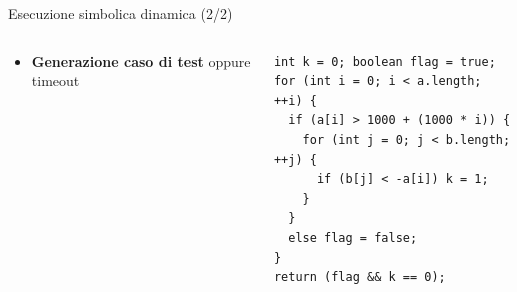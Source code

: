 \documentclass{beamer}
\begin{document}
\begin{frame}[fragile]{Esecuzione simbolica dinamica (2/2)}
\begin{columns}[T]
\begin{column}{\textwidth}
\begin{itemize}
\begin{itemize}
                    \item \textbf{Generazione caso di test} oppure timeout
                \end{itemize}
            \end{itemize}
            \endgroup
        \end{column}
        \begin{column}{0.53\textwidth}
            \vspace{-9.25mm}
            \hspace{-36.75mm}
            \begin{minipage}{\dimexpr\textwidth-3mm}
            \begin{lstlisting}[frame=single]
int k = 0; boolean flag = true;
for (int i = 0; i < a.length; ++i) {
  if (a[i] > 1000 + (1000 * i)) {
    for (int j = 0; j < b.length; ++j) {
      if (b[j] < -a[i]) k = 1;
    }
  } 
  else flag = false;
}
return (flag && k == 0);
            \end{lstlisting}
            \end{minipage}
        \end{column}
    \end{columns}
\end{frame}
\end{document}
